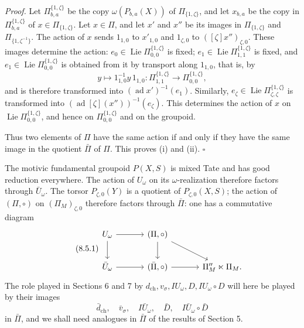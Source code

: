 \documentclass[10pt,a4paper]{article}
\newcommand{\Lie}{\operatorname{Lie}}
\newcommand{\ad}{\operatorname{ad}}
\theoremstyle{deligne}
\newenvironment{proofdel}{\textit{Proof.}}{\hfill$\square$}
\newcommand{\heading}[1]{\vspace{0.65em}\noindent{\bfseries #1}\quad}
\begin{document}
\begin{proofdel}
Let \(\Pi^{\{1,\zeta\}}_{b,a}\) be the copy \(\omega(P_{b,a}(X))\) of \(\Pi_{\{1,\zeta\}}\), and let \(x_{b,a}\) be the copy in \(\Pi^{\{1,\zeta\}}_{b,a}\) of \(x\in\Pi_{\{1,\zeta\}}\). Let \(x\in\Pi\), and let \(x'\) and \(x''\) be its images in \(\Pi_{\{1,\zeta\}}\) and \(\Pi_{\{1,\zeta^{-1}\}}\). The action of \(x\) sends \(1_{1,0}\) to \(x'_{1,0}\) and \(1_{\zeta,0}\) to \(([\zeta]x'')_{\zeta,0}\). These images determine the action: \(e_0\in\Lie\Pi^{\{1,\zeta\}}_{0,0}\) is fixed; \(e_1\in\Lie\Pi^{\{1,\zeta\}}_{1,1}\) is fixed, and \(e_1\in\Lie\Pi^{\{1,\zeta\}}_{0,0}\) is obtained from it by transport along \(1_{1,0}\), that is, by
\[
y\longmapsto 1_{1,0}^{-1}y\,1_{1,0}:\Pi^{\{1,\zeta\}}_{1,1}\longrightarrow\Pi^{\{1,\zeta\}}_{0,0},
\]
and is therefore transformed into \((\ad x')^{-1}(e_1)\). Similarly, \(e_\zeta\in\Lie\Pi^{\{1,\zeta\}}_{\zeta,\zeta}\) is transformed into \((\ad[\zeta](x''))^{-1}(e_\zeta)\). This determines the action of \(x\) on \(\Lie\Pi^{\{1,\zeta\}}_{0,0}\), and hence on \(\Pi^{\{1,\zeta\}}_{0,0}\) and on the groupoid.

Thus two elements of \(\Pi\) have the same action if and only if they have the same image in the quotient \(\bar\Pi\) of \(\Pi\). This proves (i) and (ii).
\end{proofdel}

\heading{8.5.} The motivic fundamental groupoid \(P(X,S)\) is mixed Tate and has good reduction everywhere. The action of \(U_\omega\) on its \(\omega\)-realization therefore factors through \(\bar U_\omega\). The torsor \(P_{\zeta,0}(Y)\) is a quotient of \(P_{\zeta,0}(X,S)\); the action of \((\Pi,\circ)\) on \((\Pi_M)_{\zeta,0}\) therefore factors through \(\bar\Pi\): one has a commutative diagram
\[
\tag{8.5.1}
\begin{tikzcd}[column sep=3.4em,row sep=2.1em]
U_\omega \arrow[r] \arrow[d] & (\Pi,\circ) \arrow[d] \arrow[dr] & \\
\bar U_\omega \arrow[r] & (\bar\Pi,\circ) \arrow[r] & \Pi_M^{\prime\prime}\ltimes\Pi_M .
\end{tikzcd}
\]
The role played in Sections 6 and 7 by \(d_{\mathrm{ch}},v_\sigma,IU_\omega,D,IU_\omega\circ D\) will here be played by their images
\[
\bar d_{\mathrm{ch}},\quad \bar v_\sigma,\quad I\bar U_\omega,\quad \bar D,\quad I\bar U_\omega\circ\bar D
\]
in \(\bar\Pi\), and we shall need analogues in \(\bar\Pi\) of the results of Section 5.
\end{document}
